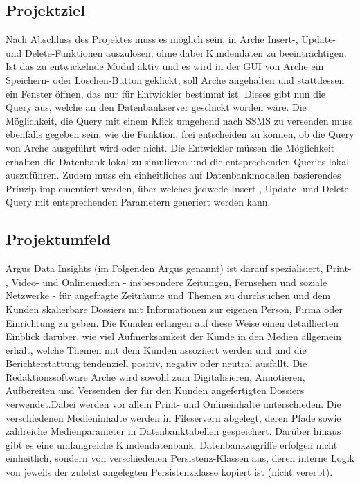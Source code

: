 \documentclass[11pt,toc=sectionentrywithoutdots, 
headheight=44pt, headings=optiontoheadandtoc, hyperfootnotes=false, hypertexnames=false]{scrartcl}
\begin{document}
\subsection{Projektziel}
Nach Abschluss des Projektes muss es möglich sein, in Arche Insert-, Update- und Delete-Funktionen auszulösen, ohne dabei Kundendaten zu beeinträchtigen. Ist das zu entwickelnde Modul aktiv und es wird in der GUI von Arche ein Speichern- oder Löschen-Button geklickt, soll Arche angehalten und stattdessen ein Fenster öffnen, das nur für Entwickler bestimmt ist. Dieses gibt nun die Query aus, welche an den Datenbankserver geschickt worden wäre. Die Möglichkeit, die Query mit einem Klick umgehend nach \acs{SSMS} zu versenden muss ebenfalls gegeben sein, wie die Funktion, frei entscheiden zu können, ob die Query von Arche ausgeführt wird oder nicht. Die Entwickler müssen die Möglichkeit erhalten die Datenbank lokal zu simulieren und die entsprechenden Queries lokal auszuführen. Zudem muss ein einheitliches auf Datenbankmodellen basierendes Prinzip implementiert werden, über welches jedwede Insert-, Update- und Delete-Query mit entsprechenden Parametern generiert werden kann.%

\subsection{Projektumfeld}
Argus Data Insights (im Folgenden \glqq Argus\grqq{} genannt) ist darauf spezialisiert, Print- , Video- und Onlinemedien - insbesondere Zeitungen, Fernsehen und soziale Netzwerke - für angefragte Zeiträume und Themen zu durchsuchen und dem Kunden skalierbare Dossiers mit Informationen zur eigenen Person, Firma oder Einrichtung zu geben. Die Kunden erlangen auf diese Weise einen detaillierten Einblick darüber, wie viel Aufmerksamkeit der Kunde in den Medien allgemein erhält, welche Themen mit dem Kunden assoziiert werden und und die Berichterstattung tendenziell positiv, negativ oder neutral ausfällt. Die Redaktionssoftware Arche wird sowohl zum Digitalisieren, Annotieren, Aufbereiten und Versenden der für den Kunden angefertigten Dossiers verwendet.\newline Dabei werden vor allem Print- und Onlineinhalte unterschieden. Die verschiedenen Medieninhalte werden in Fileservern abgelegt, deren Pfade sowie zahlreiche Medienparameter in Datenbanktabellen gespeichert. Darüber hinaus gibt es eine umfangreiche Kundendatenbank. Datenbankzugriffe erfolgen nicht einheitlich, sondern von verschiedenen \gls{Persistenz}-Klassen aus, deren interne Logik von jeweils der zuletzt angelegten Persistenzklasse kopiert ist (nicht vererbt).
\end{document}
